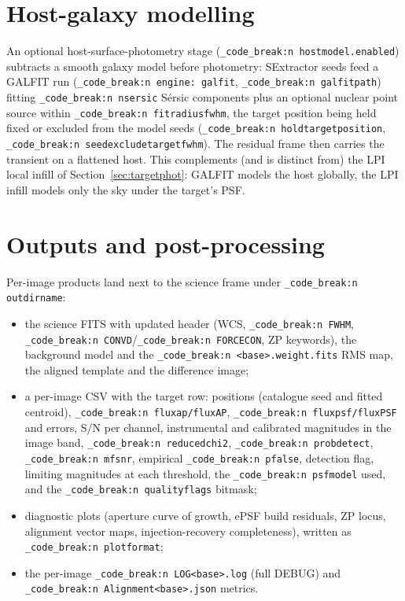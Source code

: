\documentclass[11pt,a4paper]{article}
\renewcommand{\_}{\autophotunderscore\allowbreak}
\DeclareRobustCommand{\code}[1]{\texttt{\autophot_code_break:n {#1}}}
\begin{document}


\section{Host-galaxy modelling}
\label{sec:hostmodel}

An optional host-surface-photometry stage
(\code{host\_model.enabled}) subtracts a smooth galaxy model before
photometry: SExtractor seeds feed a GALFIT run
\citep{peng2002galfit} (\code{engine: galfit},
\code{galfit\_path}) fitting \code{n\_sersic} S\'ersic components plus an
optional nuclear point source within \code{fit\_radius\_fwhm}, the target
position being held fixed or excluded from the model seeds
(\code{hold\_target\_position}, \code{seed\_exclude\_target\_fwhm}). The
residual frame then carries the transient on a flattened host. This
complements (and is distinct from) the LPI local infill of
Section~\ref{sec:targetphot}: GALFIT models the host globally, the LPI
infill models only the sky under the target's PSF.

\section{Outputs and post-processing}
\label{sec:outputs}

Per-image products land next to the science frame under
\code{outdir\_name}:

\begin{itemize}[leftmargin=1.6em,itemsep=1pt]
\item the science FITS with updated header (WCS, \code{FWHM},
\code{CONVD}\slash\code{FORCECON}, ZP keywords), the background model and the
\code{<base>.weight.fits} RMS map, the aligned template and the
difference image;
\item a per-image CSV with the target row: positions (catalogue seed and
fitted centroid), \code{flux\_ap/flux\_AP}, \code{flux\_psf/flux\_PSF} and
errors, S/N per channel, instrumental and calibrated magnitudes in the
image band, \code{reduced\_chi2}, \code{prob\_detect}, \code{mf\_snr},
empirical \code{p\_false}, detection flag, limiting magnitudes at each
threshold, the \code{psf\_model} used, and the \code{quality\_flags}
bitmask;
\item diagnostic plots (aperture curve of growth, ePSF build residuals,
ZP locus, alignment vector maps, injection-recovery completeness),
written as \code{plot\_format};
\item the per-image \code{LOG\_<base>.log} (full DEBUG) and
\code{Alignment\_<base>.json} metrics.
\end{itemize}
\end{document}
